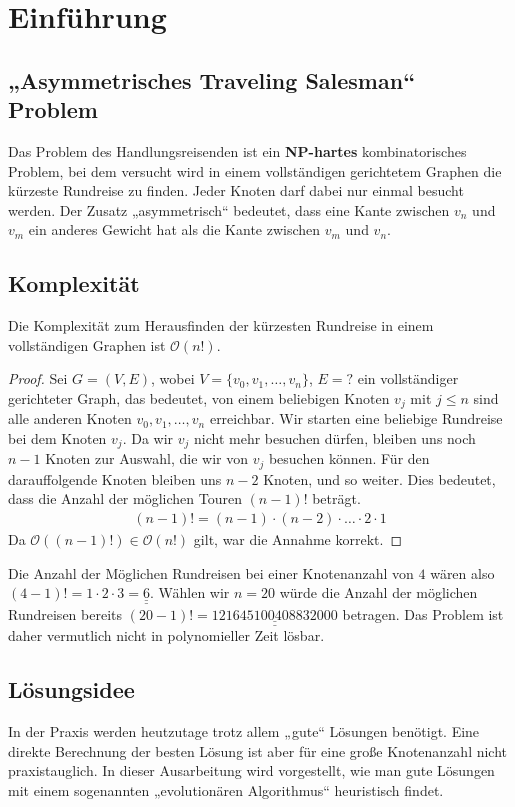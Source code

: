 \section{Einführung}
\subsection{„Asymmetrisches Traveling Salesman“ Problem}
Das Problem des Handlungsreisenden ist ein
\textbf{NP-hartes} kombinatorisches Problem, bei dem versucht wird in
einem vollständigen gerichtetem Graphen die kürzeste Rundreise zu finden. Jeder
Knoten darf dabei nur einmal besucht werden. Der Zusatz „asymmetrisch“
bedeutet, dass eine Kante zwischen $v_n$ und $v_m$ ein anderes Gewicht
hat als die Kante zwischen $v_m$ und $v_n$.

\subsection{Komplexität}
\begin{theorem}
Die Komplexität zum Herausfinden der kürzesten Rundreise in einem
vollständigen Graphen ist $\mathcal{O}(n!)$. 
\end{theorem}

\begin{proof}
Sei $G=(V,E)$, wobei $V = \{ v_0, v_1, \dotsc, v_n\}$, $E= ?$ ein
vollständiger gerichteter Graph, das bedeutet, von einem
beliebigen Knoten $v_j$ mit $j \leq n$ sind alle anderen Knoten $v_0, v_1, \dotsc, v_n$
erreichbar. Wir starten eine beliebige Rundreise bei dem Knoten $v_j$.
Da wir $v_j$ nicht mehr besuchen dürfen, bleiben uns noch 
$n-1$ Knoten zur Auswahl, die wir von $v_j$ besuchen können. Für den
darauffolgende Knoten bleiben uns $n-2$ Knoten, und so weiter. Dies bedeutet, dass 
die Anzahl der möglichen Touren $(n-1)!$ beträgt.
\begin{align*}
  (n-1)! = (n-1) \cdot (n-2) \cdot \dotsc \cdot 2 \cdot 1
\end{align*}
Da $\mathcal{O}((n-1)!) \in \mathcal{O}(n!)$ gilt, war die Annahme
korrekt.
\end{proof}
\begin{bem}
Die Anzahl der Möglichen Rundreisen bei einer Knotenanzahl von $4$ wären also
$(4-1)! = 1 \cdot 2 \cdot 3 =\underline{\underline{6}}$. Wählen wir $n = 20$ würde die
Anzahl der möglichen Rundreisen bereits $(20-1)! =
\underline{\underline{121645100408832000}}$ betragen.
Das Problem ist daher vermutlich nicht in polynomieller Zeit lösbar.
\end{bem}

\subsection{Lösungsidee}
In der Praxis werden heutzutage trotz allem „gute“ Lösungen benötigt.
Eine direkte Berechnung der besten Lösung ist aber für eine große
Knotenanzahl nicht praxistauglich. In dieser Ausarbeitung wird
vorgestellt, wie man gute Lösungen mit einem sogenannten „evolutionären
Algorithmus“ heuristisch findet.
